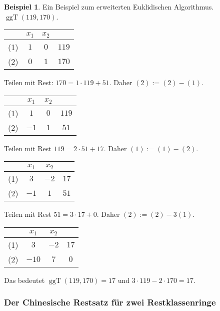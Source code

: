 \documentclass[
a4paper,landscape,16pt,
bibliography=totocnumbered,
numbers=noenddot,
]{scrartcl}
\numberwithin{equation}{subsection}
\newcommand{\ggT}{\operatorname{ggT}} %
\theoremstyle{plain}
\theoremstyle{definition}
\newtheorem*{bsp}{Beispiel}
\begin{document}
\begin{bsp} 
	Ein Beispiel zum erweiterten Euklidischen Algorithmus. $\ggT(119,170)$. 
	
	\begin{center}
	\begin{tabular}{c|cc|c}
		& $x_1$ & $x_2$ & 
		\\ \hline 
		(1) & $1$ & $0$ & $119$ 
\\		(2) & $0$  & $1$ & $170$
	\end{tabular}
\end{center}  

	Teilen mit Rest: $170 = 1 \cdot 119 + 51$. Daher $(2) := (2) - (1)$. 
	
	\begin{center}
	\begin{tabular}{c|cc|c}
	& $x_1$ & $x_2$ & 
	\\ \hline 
	(1) & $1$ & $0$ & $119$ 
	\\		(2) & $-1$  & $1$ & $51$
\end{tabular} 
\end{center} 

	Teilen mit Rest $119 =2 \cdot 51 + 17$. Daher $(1):= (1) - (2)$. 
	
	\begin{center}
	\begin{tabular}{c|cc|c}
		& $x_1$ & $x_2$ & 
		\\ \hline 
		(1) & $3$ & $-2$ & $17$ 
		\\		(2) & $-1$  & $1$ & $51$
	\end{tabular} 
\end{center} 

Teilen mit Rest $51 = 3 \cdot 17 + 0$. Daher $(2) := (2) - 3 (1)$. 

	\begin{center}
	\begin{tabular}{c|cc|c}
		& $x_1$ & $x_2$ & 
		\\ \hline 
		(1) & $3$ & $-2$ & $17$ 
		\\		(2) & $-10$  & $7$ & $0$
	\end{tabular} 
\end{center} 

	Das bedeutet $\ggT(119,170) = 17$ und $ 3 \cdot 119 - 2 \cdot 170 = 17$. 


\end{bsp} 


\subsubsection{Der Chinesische Restsatz für zwei Restklassenringe} 
\end{document}

